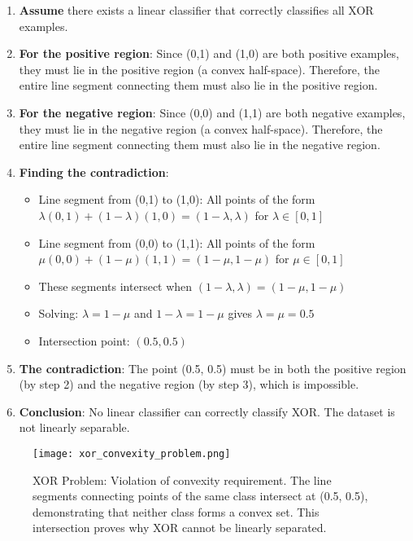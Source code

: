 \begin{enumerate}
    \item \textbf{Assume} there exists a linear classifier that correctly classifies all XOR examples.

    \item \textbf{For the positive region}: Since (0,1) and (1,0) are both positive examples, they must lie in the positive region (a convex half-space). Therefore, the entire line segment connecting them must also lie in the positive region.

    \item \textbf{For the negative region}: Since (0,0) and (1,1) are both negative examples, they must lie in the negative region (a convex half-space). Therefore, the entire line segment connecting them must also lie in the negative region.

    \item \textbf{Finding the contradiction}:
    \begin{itemize}
        \item Line segment from (0,1) to (1,0): All points of the form \(\lambda(0,1) + (1-\lambda)(1,0) = (1-\lambda, \lambda)\) for \(\lambda \in [0,1]\)
        \item Line segment from (0,0) to (1,1): All points of the form \(\mu(0,0) + (1-\mu)(1,1) = (1-\mu, 1-\mu)\) for \(\mu \in [0,1]\)
        \item These segments intersect when \((1-\lambda, \lambda) = (1-\mu, 1-\mu)\)
        \item Solving: \(\lambda = 1-\mu\) and \(1-\lambda = 1-\mu\) gives \(\lambda = \mu = 0.5\)
        \item Intersection point: \((0.5, 0.5)\)
    \end{itemize}

    \item \textbf{The contradiction}: The point (0.5, 0.5) must be in both the positive region (by step 2) and the negative region (by step 3), which is impossible.

    \item \textbf{Conclusion}: No linear classifier can correctly classify XOR. The dataset is not linearly separable.
\end{enumerate}

\begin{figure}[h]
    \centering
    \texttt{[image: xor\_convexity\_problem.png]}
    \caption{XOR Problem: Violation of convexity requirement. The line segments connecting points of the same class intersect at (0.5, 0.5), demonstrating that neither class forms a convex set. This intersection proves why XOR cannot be linearly separated.}
    \label{fig:xor_convexity_problem}
\end{figure}

